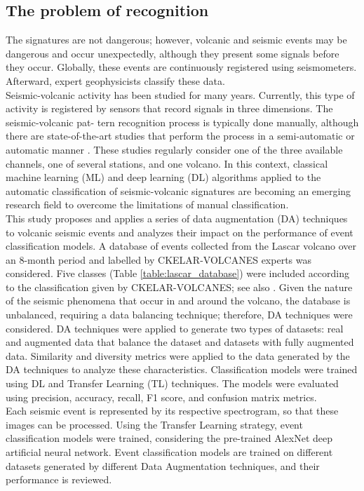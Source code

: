 \documentclass[lettersize,journal]{IEEEtran}
\begin{document}
\subsection{The problem of recognition}
\noindent The signatures are not dangerous; however, volcanic and seismic events may be dangerous and occur unexpectedly, although they present some signals before they occur. Globally, these events are continuously registered using seismometers. Afterward, expert geophysicists classify these data.\\
Seismic-volcanic activity has been studied for many years. Currently, this type of activity is registered by sensors that record signals in three dimensions. The seismic-volcanic pat- tern recognition process is typically done manually, although there are state-of-the-art studies that perform the process in a semi-automatic or automatic manner \cite{salazar2022multi,salazar2020deep,malfante2018automatic,bicego2012classification,curilem2016pattern, lara2020automatic}. These studies regularly consider one of the three available channels, one of several stations, and one volcano. In this context, classical machine learning (ML) and deep learning (DL) algorithms applied to the automatic classification of seismic-volcanic signatures are becoming an emerging research field to overcome the limitations of manual classification.\\
This study proposes and applies a series of data augmentation (DA) techniques to volcanic seismic events and analyzes their impact on the performance of event classification models. A database of events collected from the Lascar volcano over  an 8-month period and labelled by CKELAR-VOLCANES experts was considered. Five classes (Table \ref{table:lascar_database}) were included according to the classification given by CKELAR-VOLCANES; see also \cite{salazar2022multi}. Given the nature of the seismic phenomena that occur in and around the volcano, the database is unbalanced, requiring a data balancing technique; therefore, DA techniques were considered. DA techniques were applied to generate two types of datasets: real and augmented data that balance the dataset and datasets with fully augmented data. Similarity and diversity metrics were applied to the data generated by the DA techniques to analyze these characteristics. Classification models were trained using DL and Transfer Learning (TL) techniques. The models were evaluated using precision, accuracy, recall, F1 score, and confusion matrix metrics. \\
Each seismic event is represented by its respective spectrogram, so that these images can be processed. Using the Transfer Learning strategy, event classification models were trained, considering the pre-trained AlexNet deep artificial neural network. Event classification models are trained on different datasets generated by different Data Augmentation techniques, and their performance is reviewed. \\
\end{document}
